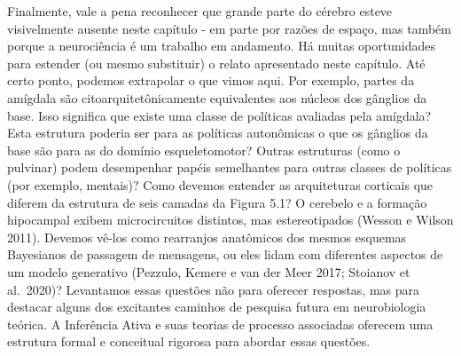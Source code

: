 \documentclass[
  12pt,
]{book}
\begin{document}
Finalmente, vale a pena reconhecer que grande parte do cérebro esteve visivelmente ausente neste capítulo - em parte por razões de espaço, mas também porque a neurociência é um trabalho em andamento. Há muitas oportunidades para estender (ou mesmo substituir) o relato apresentado neste capítulo. Até certo ponto, podemos extrapolar o que vimos aqui. Por exemplo, partes da amígdala são citoarquitetônicamente equivalentes aos núcleos dos gânglios da base. Isso significa que existe uma classe de políticas avaliadas pela amígdala? Esta estrutura poderia ser para as políticas autonômicas o que os gânglios da base são para as do domínio esqueletomotor? Outras estruturas (como o pulvinar) podem desempenhar papéis semelhantes para outras classes de políticas (por exemplo, mentais)? Como devemos entender as arquiteturas corticais que diferem da estrutura de seis camadas da Figura 5.1? O cerebelo e a formação hipocampal exibem microcircuitos distintos, mas estereotipados (Wesson e Wilson 2011). Devemos vê-los como rearranjos anatômicos dos mesmos esquemas Bayesianos de passagem de mensagens, ou eles lidam com diferentes aspectos de um modelo generativo (Pezzulo, Kemere e van der Meer 2017; Stoianov et al.~2020)? Levantamos essas questões não para oferecer respostas, mas para destacar alguns dos excitantes caminhos de pesquisa futura em neurobiologia teórica. A Inferência Ativa e suas teorias de processo associadas oferecem uma estrutura formal e conceitual rigorosa para abordar essas questões.
\end{document}
